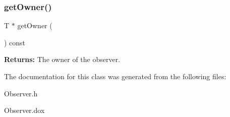 \subsubsection{\texorpdfstring{get\+Owner()}{getOwner()}}
{\footnotesize\ttfamily T $\ast$ get\+Owner (\begin{DoxyParamCaption}{ }\end{DoxyParamCaption}) const\hspace{0.3cm}{\ttfamily [inline]}}

{\bfseries Returns\+:} The owner of the observer. 

The documentation for this class was generated from the following files\+:\begin{DoxyCompactItemize}
\item 
Observer.\+h\item 
Observer.\+dox\end{DoxyCompactItemize}
